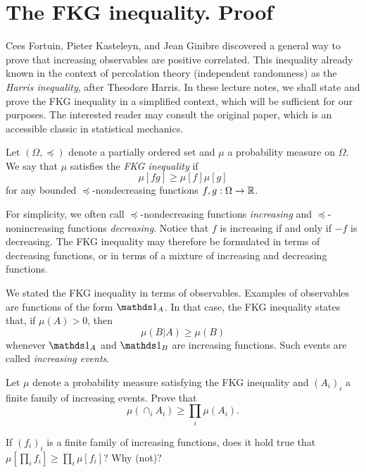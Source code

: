 \section{The FKG inequality. Proof}

Cees Fortuin, Pieter Kasteleyn, and Jean Ginibre discovered a general
way to prove that increasing observables are positive correlated.
This inequality already known in the context of percolation
theory (independent randomness) as the \emph{Harris inequality},
after Theodore Harris.
In these lecture notes, we shall state and prove the FKG inequality in a simplified
context, which will be sufficient for our purposes.
The interested reader may consult the original paper, which is an accessible classic in statistical mechanics.

\begin{definition}
    Let $(\Omega,\preceq)$ denote a partially ordered set
    and $\mu$ a probability measure on $\Omega$.
    We say that $\mu$ satisfies the \emph{FKG inequality}
    if
    \begin{equation}
        \label{eq:FKG}
        \mu[fg]\geq \mu[f]\mu[g]
    \end{equation}
    for any bounded $\preceq$-nondecreasing functions
    $f,g:\Omega\to\mathbb R$.
\end{definition}

For simplicity, we often call $\preceq$-nondecreasing functions \emph{increasing}
and $\preceq$-nonincreasing functions \emph{decreasing}.
Notice that $f$ is increasing if and only if $-f$ is decreasing.
The FKG inequality may therefore be formulated in terms of decreasing functions,
or in terms of a mixture of increasing and decreasing functions.

\begin{remark}
    We stated the FKG inequality in terms of observables.
    Examples of observables are functions of the form $\ind{A}$.
    In that case, the FKG inequality states that, if $\mu(A)>0$,
    then
    \[
        \mu(B|A)\geq \mu(B)
    \]
    whenever $\ind{A}$ and $\ind{B}$ are increasing functions.
    Such events are called \emph{increasing events}.
\end{remark}

\begin{exercise}
    Let $\mu$ denote a probability measure satisfying the FKG inequality and
     $(A_i)_i$ a finite family of increasing events.
    Prove that
    \[
        \mu(\cap_i A_i)\geq \prod_i\mu(A_i).
    \]
    
    If $(f_i)_i$ is a finite family of increasing functions,
    does it hold true that $\mu[\prod_i f_i]\geq \prod_i \mu[f_i]$?
    Why (not)?
\end{exercise}

